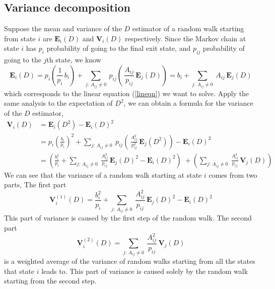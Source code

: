 \documentclass[a4paper,11pt]{article}
\theoremstyle{remark}
\theoremstyle{definition}
\begin{document}
    \subsection{Variance decomposition}
        Suppose the mean and variance of the $D$ estimator of a random walk
        starting from state $i$ are $\mathbf{E}_i(D)$ and $\mathbf{V}_i(D)$
        respectively. Since the Markov chain at state $i$ has $p_i$
        probability of going to the final exit state, and $p_{ij}$
        probability of going to the $j$th state, we know
        \[ \mathbf{E}_i(D) = p_i \left( \frac{1}{p_i}\, b_i\right) +
            \sum_{j:\,A_{ij}\ne0}\: p_{ij} \left(\,\frac{A_{ij}}{p_{ij}}\,
                                                 \mathbf{E}_j(D) \right)
            = b_i + \sum_{j:\,A_{ij}\ne0}\: A_{ij}\, \mathbf{E}_j(D)
        \]
        which corresponds to the linear equation (\ref{lineqn}) we want
        to solve. Apply the same analysis to the expectation of $D^2$,
        we can obtain a formula for the variance of the $D$ estimator,
        \begin{equation} \begin{split} \label{splittrans}
            \mathbf{V}_i(D)
            &= \mathbf{E}_i \left( D^2 \right) - \mathbf{E}_i(D)^2 \\
            &= p_i \left( \frac{b_i}{p_i}\right)^2
               + \sum_{j:\,A_{ij}\ne0}\: p_{ij}
               \left( \,\frac{A_{ij}^2}{p_{ij}^2}\, \mathbf{E}_j(D^2) \right)
               - \mathbf{E}_i(D)^2 \\
            &= \left( \frac{b_i^2}{p_i} + \sum_{j:\,A_{ij}\ne0}\:
                      \frac{A_{ij}^2}{p_{ij}}\, \mathbf{E}_j(D)^2 -
                      \mathbf{E}_i(D)^2 \right)  \;
               + \left( \sum_{j:\,A_{ij}\ne0}\: \frac{A_{ij}^2}{p_{ij}}\,
                        \mathbf{V}_j(D) \right)
        \end{split} \end{equation}
        We can see that the variance of a random walk starting at state $i$
        comes from two parts, The first part
        \begin{equation} \label{part1trans}
            \mathbf{V}_i^{(1)}(D) = \frac{b_i^2}{p_i}
            + \sum_{j:\,A_{ij}\ne0}\:
            \frac{A_{ij}^2}{p_{ij}}\, \mathbf{E}_j(D)^2
            - \mathbf{E}_i(D)^2
        \end{equation}
        This part of variance is caused by the first step of the random walk.
        The second part
        \begin{equation} \label{part2trans}
            \mathbf{V}_i^{(2)}(D) = \sum_{j:\,A_{ij}\ne0}\:
                \frac{A_{ij}^2}{p_{ij}}\, \mathbf{V}_j(D)
        \end{equation}
        is a weighted average of the variance of random walks starting from
        all the states that state $i$ leads to.  This part of variance is
        caused solely by the random walk starting from the second step.
        
\end{document}
